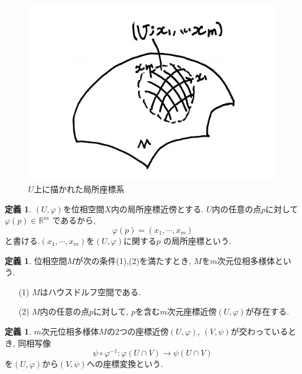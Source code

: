 \documentclass[a4j,12pt]{jarticle}
\theoremstyle{definition}
\newtheorem{definition}[theorem]{定義}
\begin{document}
    \begin{figure}[H]
        \centering
        \includegraphics[keepaspectratio, scale=0.2]{DrawnLocalCoSysBig.pdf}
        \caption{$U$上に描かれた局所座標系}
        \label{DrawnLocalCoSysd}
       \end{figure}
\begin{definition}
    $(U, \varphi)$を位相空間$X$内の局所座標近傍とする.
    $U$内の任意の点$p$に対して$\varphi(p) \in \mathbb{R}^m$
    であるから, 
    $$\varphi(p)=(x_1, \cdots ,x_m)$$
    と書ける.$(x_1, \cdots ,x_m)$を$(U, \varphi)$に関する$p$
    の局所座標という.
\end{definition}
\begin{definition}
    位相空間$M$が次の条件(1),(2)を満たすとき, 
    $M$を$m$次元位相多様体という. 
    \begin{itemize}
        \item[(1)]$M$はハウスドルフ空間である.
        \item[(2)]$M$内の任意の点$p$に対して, 
        $p$を含む$m$次元座標近傍$(U,\varphi)$が存在する.
    \end{itemize}
\end{definition}
\begin{definition}
    $m$次元位相多様体$M$の$2$つの座標近傍$(U, \varphi)$, 
    $(V, \psi)$が交わっているとき, 同相写像
    $$\psi \circ \varphi^{-1}:\varphi(U\cap V)\rightarrow \psi(U\cap V)$$
    を$(U, \varphi)$から$(V, \psi)$への座標変換という. 
\end{definition}
\end{document}
